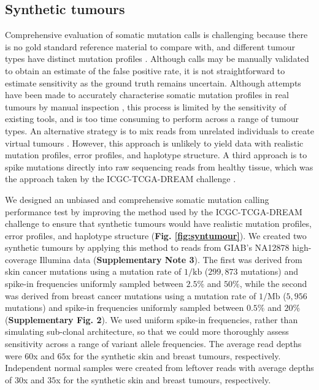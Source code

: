 \documentclass[notitlepage, twocolumn, 10pt]{article}
\begin{document}
\subsection*{Synthetic tumours}
Comprehensive evaluation of somatic mutation calls is challenging because there is no gold standard reference material to compare with, and different tumour types have distinct mutation profiles \cite{RN86}. Although calls may be manually validated to obtain an estimate of the false positive rate, it is not straightforward to estimate sensitivity as the ground truth remains uncertain. Although attempts have been made to accurately characterise somatic mutation profiles in real tumours by manual inspection \cite{RN155}, this process is limited by the sensitivity of existing tools, and is too time consuming to perform across a range of tumour types. An alternative strategy is to mix reads from unrelated individuals to create virtual tumours \cite{RN142, RN604}. However, this approach is unlikely to yield data with realistic mutation profiles, error profiles, and haplotype structure. A third approach is to spike mutations directly into raw sequencing reads from healthy tissue, which was the approach taken by the ICGC-TCGA-DREAM challenge \cite{RN147}.

We designed an unbiased and comprehensive somatic mutation calling performance test by improving the method used by the ICGC-TCGA-DREAM challenge to ensure that synthetic tumours would have realistic mutation profiles, error profiles, and haplotype structure (\textbf{Fig. \ref{fig:syntumour}}). We created two synthetic tumours by applying this method to reads from GIAB's NA12878 high-coverage Illumina data (\textbf{Supplementary Note 3}). The first was derived from skin cancer mutations using a mutation rate of $1/\text{kb}$ ($299,873$ mutations) and spike-in frequencies uniformly sampled between $2.5\%$ and $50\%$, while the second was derived from breast cancer mutations using a mutation rate of $1/\text{Mb}$ ($5,956$ mutations) and spike-in frequencies uniformly sampled between $0.5\%$ and $20\%$ (\textbf{Supplementary Fig. 2}). We used uniform spike-in frequencies, rather than simulating sub-clonal architecture, so that we could more thoroughly assess sensitivity across a range of variant allele frequencies. The average read depths were $60$x and $65$x for the synthetic skin and breast tumours, respectively. Independent normal samples were created from leftover reads with average depths of $30$x and $35$x for the synthetic skin and breast tumours, respectively.
\end{document}
